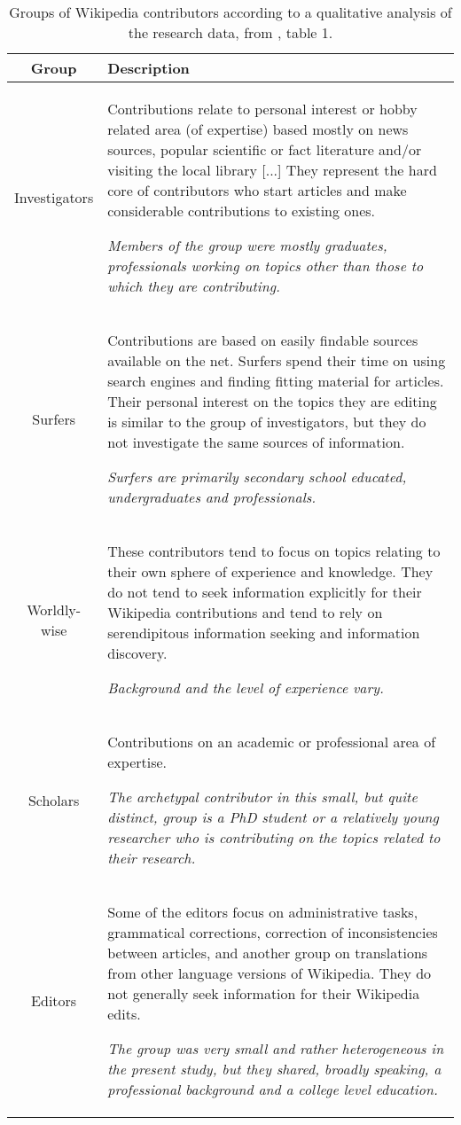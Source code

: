 \begin{table}
\caption{\label{tab:Groups-of-Wikipedia}Groups of Wikipedia contributors according
to a qualitative analysis of the research data, from \citet{Huvila10},
table 1.}

\begin{tabular}{|c|>{\centering}p{14cm}|}
\hline 
Group & Description\tabularnewline
\hline 
\hline 
Investigators & Contributions relate to personal interest or hobby related area (of
expertise) based mostly on news sources, popular scientific or fact
literature and/or visiting the local library {[}...{]} They represent
the hard core of contributors who start articles and make considerable
contributions to existing ones. 

\textit{Members of the group were mostly graduates, professionals
working on topics other than those to which they are contributing.} \tabularnewline
\hline 
Surfers & Contributions are based on easily findable sources available on the
net. Surfers spend their time on using search engines and finding
fitting material for articles. Their personal interest on the topics
they are editing is similar to the group of investigators, but they
do not investigate the same sources of information.

\textit{Surfers are primarily secondary school educated, undergraduates
and professionals.}\tabularnewline
\hline 
Worldly-wise & These contributors tend to focus on topics relating to their own sphere
of experience and knowledge. They do not tend to seek information
explicitly for their Wikipedia contributions and tend to rely on serendipitous
information seeking and information discovery. 

\textit{Background and the level of experience vary.}\tabularnewline
\hline 
Scholars & Contributions on an academic or professional area of expertise. 

\textit{The archetypal contributor in this small, but quite distinct,
group is a PhD student or a relatively young researcher who is contributing
on the topics related to their research.}\tabularnewline
\hline 
Editors & Some of the editors focus on administrative tasks, grammatical corrections,
correction of inconsistencies between articles, and another group
on translations from other language versions of Wikipedia. They do
not generally seek information for their Wikipedia edits. 

\textit{The group was very small and rather heterogeneous in the present
study, but they shared, broadly speaking, a professional background
and a college level education. }\tabularnewline
\hline 
\end{tabular}
\end{table}

